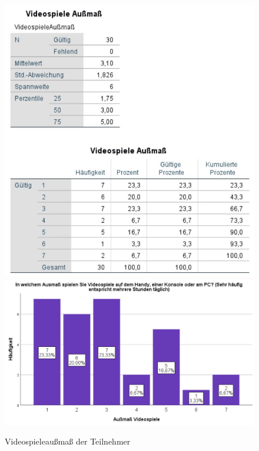 \documentclass[a4paper,11pt]{article}%
\renewcommand{\\}{\vspace*{0.5\baselineskip} \newline}
\begin{document}
	\begin{figure}[H]
		\begin{footnotesize}
			\includegraphics[width=\textwidth]{Abbildungen/Pre_QuestionnaireStatistiks/teilnehmerVideospieleAußmaß}\\
			\includegraphics[width=\textwidth]{Abbildungen/Demographie/teilnehmerVideospieleAußmaß}\\
			\caption{Videospieleaußmaß der Teilnehmer}
			\label{fig:teilnehmerVideospieleAußmaß}
		\end{footnotesize}
	\end{figure}		
\end{document}
